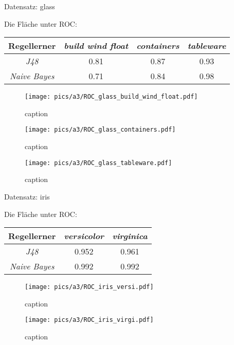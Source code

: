 Datensatz: glass

Die Fl\"ache unter ROC:

\begin{tabular}{c|c|c|c}
				Regellerner       & \emph{build wind float} & \emph{containers} & \emph{tableware}  \\ \hline
				\emph{J48}			& 0.81 & 0.87 & 0.93  \\ \hline
				\emph{Naive Bayes}  & 0.71 & 0.84 & 0.98  
\end{tabular}
\begin{figure}[htbp]
	\centering
		\texttt{[image: pics/a3/ROC\_glass\_build\_wind\_float.pdf]}
	\caption{caption}
	\label{fig:pics_a3_ROC_glass_build_wind_float}
\end{figure}

\begin{figure}[htbp]
	\centering
		\texttt{[image: pics/a3/ROC\_glass\_containers.pdf]}
	\caption{caption}
	\label{fig:pics_a3_ROC_glass_containers}
\end{figure}

\begin{figure}[htbp]
	\centering
		\texttt{[image: pics/a3/ROC\_glass\_tableware.pdf]}
	\caption{caption}
	\label{fig:pics_a3_ROC_glass_tableware}
\end{figure}


Datensatz: iris

Die Fläche unter ROC:


\begin{tabular}{c|c|c}
				Regellerner       & \emph{versicolor} & \emph{virginica}  \\ \hline
				\emph{J48}			& 0.952 & 0.961  \\ \hline
				\emph{Naive Bayes}  & 0.992 & 0.992  
\end{tabular}

\begin{figure}[htbp]
	\centering
		\texttt{[image: pics/a3/ROC\_iris\_versi.pdf]}
	\caption{caption}
	\label{fig:pics_a3_ROC_iris_versi}
\end{figure}


\begin{figure}[htbp]
	\centering
		\texttt{[image: pics/a3/ROC\_iris\_virgi.pdf]}
	\caption{caption}
	\label{fig:pics_a3_ROC_iris_virgi}
\end{figure}

